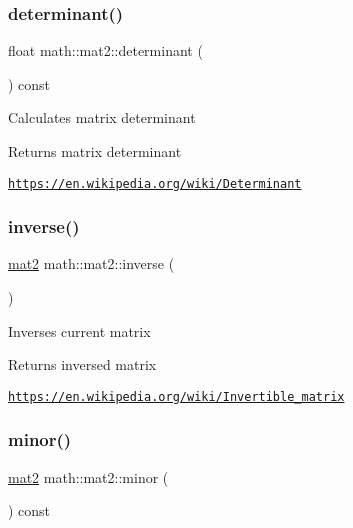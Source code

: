 \subsubsection{\texorpdfstring{determinant()}{determinant()}}
{\footnotesize\ttfamily float math\+::mat2\+::determinant (\begin{DoxyParamCaption}{ }\end{DoxyParamCaption}) const\hspace{0.3cm}{\ttfamily [inline]}}

Calculates matrix determinant \begin{DoxyReturn}{Returns}
matrix determinant
\end{DoxyReturn}
\href{https://en.wikipedia.org/wiki/Determinant}{\tt https\+://en.\+wikipedia.\+org/wiki/\+Determinant} \mbox{\label{structmath_1_1mat2_aa3e143e6c1338df92888a623b2ace226}} 
\subsubsection{\texorpdfstring{inverse()}{inverse()}}
{\footnotesize\ttfamily \hyperlink{structmath_1_1mat2}{mat2} math\+::mat2\+::inverse (\begin{DoxyParamCaption}{ }\end{DoxyParamCaption})\hspace{0.3cm}{\ttfamily [inline]}}

Inverses current matrix \begin{DoxyReturn}{Returns}
inversed matrix
\end{DoxyReturn}
\href{https://en.wikipedia.org/wiki/Invertible_matrix}{\tt https\+://en.\+wikipedia.\+org/wiki/\+Invertible\+\_\+matrix} \mbox{\label{structmath_1_1mat2_a960118b3ee04534dd99d5577496193f4}} 
\subsubsection{\texorpdfstring{minor()}{minor()}}
{\footnotesize\ttfamily \hyperlink{structmath_1_1mat2}{mat2} math\+::mat2\+::minor (\begin{DoxyParamCaption}{ }\end{DoxyParamCaption}) const\hspace{0.3cm}{\ttfamily [inline]}}

